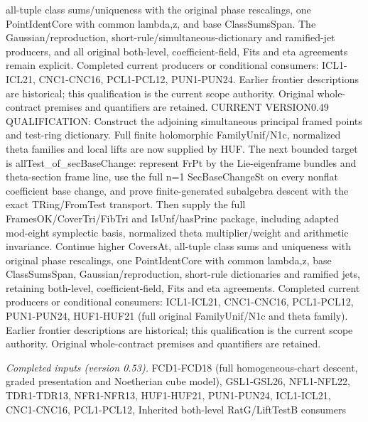 all-tuple class sums/uniqueness with the original phase rescalings, one PointIdentCore with common lambda,z, and base ClassSumsSpan. The Gaussian/reproduction, short-rule/simultaneous-dictionary and ramified-jet producers, and all original both-level, coefficient-field, Fits and eta agreements remain explicit. Completed current producers or conditional consumers: ICL1-ICL21, CNC1-CNC16, PCL1-PCL12, PUN1-PUN24. Earlier frontier descriptions are historical; this qualification is the current scope authority. Original whole-contract premises and quantifiers are retained. CURRENT VERSION0.49 QUALIFICATION: Construct the adjoining simultaneous principal framed points and test-ring dictionary. Full finite holomorphic FamilyUnif/N1c, normalized theta families and local lifts are now supplied by HUF. The next bounded target is allTest\_\allowbreak of\_\allowbreak secBaseChange: represent FrPt by the Lie-eigenframe bundles and theta-section frame line, use the full n=1 SecBaseChangeSt on every nonflat coefficient base change, and prove finite-generated subalgebra descent with the exact TRing/FromTest transport. Then supply the full FramesOK/CoverTri/FibTri and IsUnf/hasPrinc package, including adapted mod-eight symplectic basis, normalized theta multiplier/weight and arithmetic invariance. Continue higher CoversAt, all-tuple class sums and uniqueness with original phase rescalings, one PointIdentCore with common lambda,z, base ClassSumsSpan, Gaussian/reproduction, short-rule dictionaries and ramified jets, retaining both-level, coefficient-field, Fits and eta agreements. Completed current producers or conditional consumers: ICL1-ICL21, CNC1-CNC16, PCL1-PCL12, PUN1-PUN24, HUF1-HUF21 (full original FamilyUnif/N1c and theta family). Earlier frontier descriptions are historical; this qualification is the current scope authority. Original whole-contract premises and quantifiers are retained.

\emph{Completed inputs (version 0.53).} FCD1-FCD18 (full homogeneous-chart descent, graded presentation and Noetherian cube model), GSL1-GSL26, NFL1-NFL22, TDR1-TDR13, NFR1-NFR13, HUF1-HUF21, PUN1-PUN24, ICL1-ICL21, CNC1-CNC16, PCL1-PCL12, Inherited both-level RatG/LiftTestB consumers

